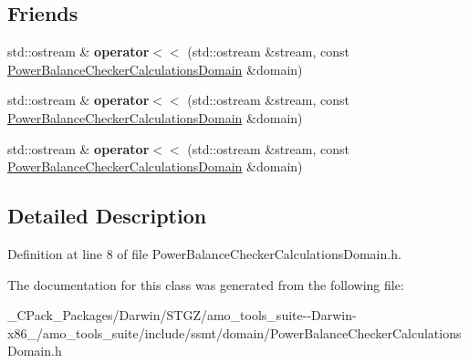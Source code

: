\subsection*{Friends}
\begin{DoxyCompactItemize}
\item 
\mbox{\label{class_power_balance_checker_calculations_domain_a86a9d101ef63820f4539ca94cb942d37}} 
std\+::ostream \& {\bfseries operator$<$$<$} (std\+::ostream \&stream, const \hyperlink{class_power_balance_checker_calculations_domain}{Power\+Balance\+Checker\+Calculations\+Domain} \&domain)
\item 
\mbox{\label{class_power_balance_checker_calculations_domain_a86a9d101ef63820f4539ca94cb942d37}} 
std\+::ostream \& {\bfseries operator$<$$<$} (std\+::ostream \&stream, const \hyperlink{class_power_balance_checker_calculations_domain}{Power\+Balance\+Checker\+Calculations\+Domain} \&domain)
\item 
\mbox{\label{class_power_balance_checker_calculations_domain_a86a9d101ef63820f4539ca94cb942d37}} 
std\+::ostream \& {\bfseries operator$<$$<$} (std\+::ostream \&stream, const \hyperlink{class_power_balance_checker_calculations_domain}{Power\+Balance\+Checker\+Calculations\+Domain} \&domain)
\end{DoxyCompactItemize}


\subsection{Detailed Description}


Definition at line 8 of file Power\+Balance\+Checker\+Calculations\+Domain.\+h.



The documentation for this class was generated from the following file\+:\begin{DoxyCompactItemize}
\item 
\+\_\+\+C\+Pack\+\_\+\+Packages/\+Darwin/\+S\+T\+G\+Z/amo\+\_\+tools\+\_\+suite-\/-\/\+Darwin-\/x86\+\_/amo\+\_\+tools\+\_\+suite/include/ssmt/domain/Power\+Balance\+Checker\+Calculations\+Domain.\+h\end{DoxyCompactItemize}
